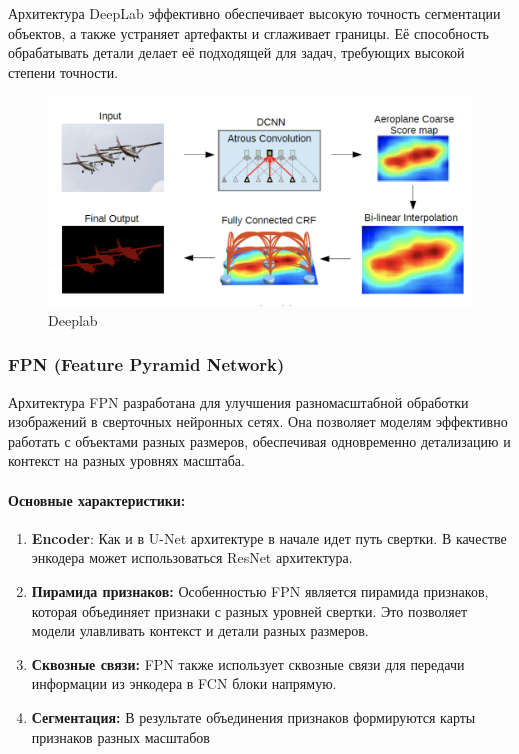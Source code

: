 \documentclass[11pt]{article}
\providecommand{\tightlist}{%
      \setlength{\itemsep}{0pt}\setlength{\parskip}{0pt}}
\begin{document}
Архитектура DeepLab эффективно обеспечивает высокую точность сегментации
объектов, а также устраняет артефакты и сглаживает границы. Её
способность обрабатывать детали делает её подходящей для задач,
требующих высокой степени точности.

\begin{figure}
\centering
\includegraphics{../resources/deeplab-architecture.png}
\caption{Deeplab}
\end{figure}

    \hypertarget{fpn-feature-pyramid-network}{%
\subsubsection{FPN (Feature Pyramid
Network)}\label{fpn-feature-pyramid-network}}

Архитектура FPN разработана для улучшения разномасштабной обработки
изображений в сверточных нейронных сетях. Она позволяет моделям
эффективно работать с объектами разных размеров, обеспечивая
одновременно детализацию и контекст на разных уровнях масштаба.

\hypertarget{ux43eux441ux43dux43eux432ux43dux44bux435-ux445ux430ux440ux430ux43aux442ux435ux440ux438ux441ux442ux438ux43aux438}{%
\paragraph{Основные
характеристики:}\label{ux43eux441ux43dux43eux432ux43dux44bux435-ux445ux430ux440ux430ux43aux442ux435ux440ux438ux441ux442ux438ux43aux438}}

\begin{enumerate}
\def\labelenumi{\arabic{enumi}.}
\tightlist
\item
  \textbf{Encoder}: Как и в U-Net архитектуре в начале идет путь
  свертки. В качестве энкодера может использоваться ResNet архитектура.
\item
  \textbf{Пирамида признаков:} Особенностью FPN является пирамида
  признаков, которая объединяет признаки с разных уровней свертки. Это
  позволяет модели улавливать контекст и детали разных размеров.
\item
  \textbf{Сквозные связи:} FPN также использует сквозные связи для
  передачи информации из энкодера в FCN блоки напрямую.
\item
  \textbf{Сегментация:} В результате объединения признаков формируются
  карты признаков разных масштабов
\end{enumerate}
\end{document}
